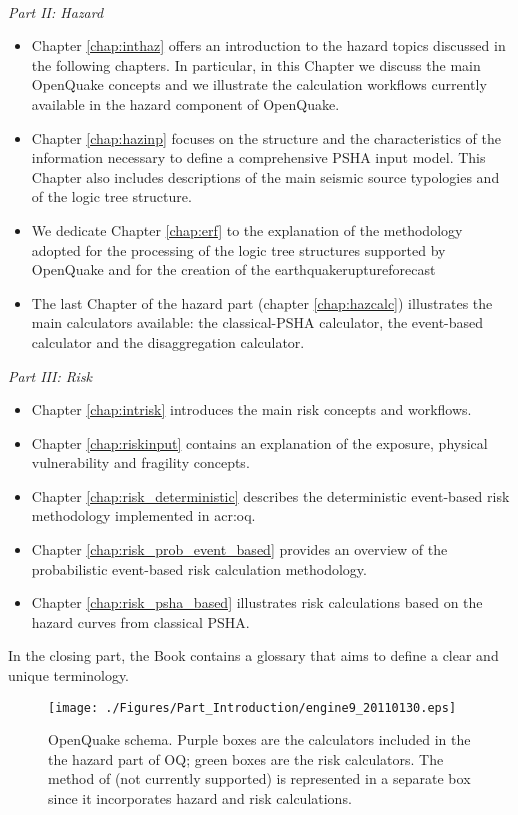 \hfill \\
\emph{Part II: Hazard}
\begin{itemize}
\item Chapter \ref{chap:inthaz} offers an introduction to the hazard 
topics discussed in the following chapters. In particular, in this 
Chapter we discuss the main OpenQuake concepts and we illustrate the 
calculation workflows currently available in the hazard component of 
OpenQuake.
\item Chapter \ref{chap:hazinp} focuses on the structure and the 
characteristics of the information necessary to define a 
comprehensive PSHA input model. This Chapter also includes
descriptions of the main seismic source typologies and of the logic 
tree structure.
\item We dedicate Chapter \ref{chap:erf} to the explanation of the
methodology adopted for the processing of the logic tree structures
supported by OpenQuake and for the creation of the 
\gls{earthquakeruptureforecast}
\item The last Chapter of the hazard part (chapter \ref{chap:hazcalc}) 
illustrates the main calculators available: the classical-PSHA calculator,
the event-based calculator and the disaggregation calculator. 
\end{itemize}
\emph{Part III: Risk}
\begin{itemize}
\item Chapter \ref{chap:intrisk} introduces the main risk concepts and workflows. 
\item Chapter \ref{chap:riskinput} contains an explanation of the exposure, 
physical vulnerability and fragility concepts.
\item Chapter \ref{chap:risk_deterministic} describes the deterministic event-based risk 
methodology implemented in \gls{acr:oq}.
\item Chapter \ref{chap:risk_prob_event_based} provides an overview of the 
probabilistic event-based risk calculation methodology.
\item Chapter \ref{chap:risk_psha_based} illustrates risk calculations based on 
the hazard curves from classical PSHA.
\end{itemize}
%
In the closing part, the Book contains a glossary that aims to define a 
clear and unique terminology.
%
\begin{landscape}
\begin{figure}
\texttt{[image: ./Figures/Part\_Introduction/engine9\_20110130.eps]}
\caption{OpenQuake schema. Purple boxes are the calculators included in the  
the hazard part of OQ; green boxes are the risk calculators. The method of 
\citet{wesson2009} (not currently supported) is represented in a separate box since it incorporates 
hazard and risk calculations.}
\label{fig:openquake_schema}
\end{figure}
\end{landscape}
